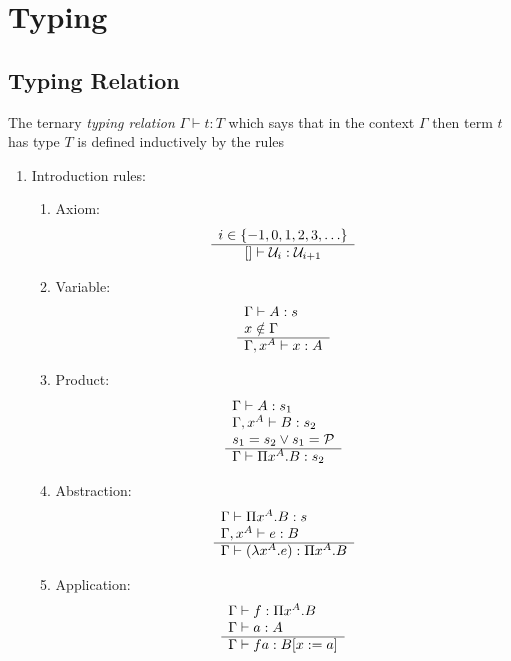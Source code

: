 \section{Typing}









\subsection{Typing Relation}


\begin{definition}
The ternary \emph{typing relation} $\Gamma \vdash t: T$ which says that in
the context $\Gamma$ then term $t$ has type $T$ is defined inductively by
the rules
\begin{enumerate}
\item Introduction rules:
    \begin{enumerate}
        \item Axiom:
            $$
            \begin{array}{c} i \in \{-1, 0, 1, 2, 3, \ldots \} \\ \hline  [] \vdash {\cal U}_i : {\cal U}_{i + 1}\end{array}
            $$

    \item Variable:
        $$
        \begin{array}{l} 
            \Gamma \vdash A: s
            \\
            x \notin \Gamma
         \\ \hline 
            \Gamma, x^A \vdash x: A
        \end{array}
        $$

    \item Product:
        $$
        \begin{array}{l} 
            \Gamma \vdash A: s_1
            \\
            \Gamma, x^A \vdash B: s_2
            \\
            s_1 = s_2 \lor s_1 = {\cal P}
         \\ \hline 
            \Gamma \vdash \Pi x^A.B : s_2
        \end{array}
        $$

    \item Abstraction:
        $$
        \begin{array}{l} 
            \Gamma \vdash \Pi x^A. B: s
            \\
            \Gamma, x^A \vdash e: B
         \\ \hline 
            \Gamma \vdash (\lambda x^A. e): \Pi x^A. B
        \end{array}
        $$

    \item Application:
        $$
        \begin{array}{l} 
            \Gamma \vdash f: \Pi x^A. B
            \\
            \Gamma \vdash a: A
         \\ \hline 
            \Gamma \vdash f a: B[x:=a]
        \end{array}
        $$
    \end{enumerate}



\end{enumerate}
\end{definition}
